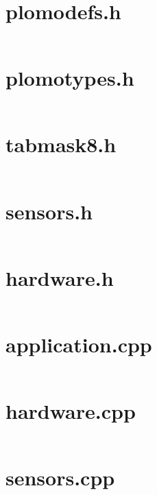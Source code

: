 
\begin{apendicesenv}
\partapendices



\chapter{plomodefs.h} 
\inputminted{cpp}{dados/algoritmos/plomodefs.h}

\chapter{plomotypes.h} 
\inputminted{cpp}{dados/algoritmos/plomotypes.h}

\chapter{tabmask8.h} 
\inputminted{cpp}{dados/algoritmos/tabmask8.h}

\chapter{sensors.h} 
\inputminted{cpp}{dados/algoritmos/sensors.h}

\chapter{hardware.h} 
\inputminted{cpp}{dados/algoritmos/hardware.h}

\chapter{application.cpp} 
\inputminted{cpp}{dados/algoritmos/application.cpp}

\chapter{hardware.cpp} 
\inputminted{cpp}{dados/algoritmos/hardware.cpp}

\chapter{sensors.cpp} 
\inputminted{cpp}{dados/algoritmos/sensors.cpp}

\end{apendicesenv}
